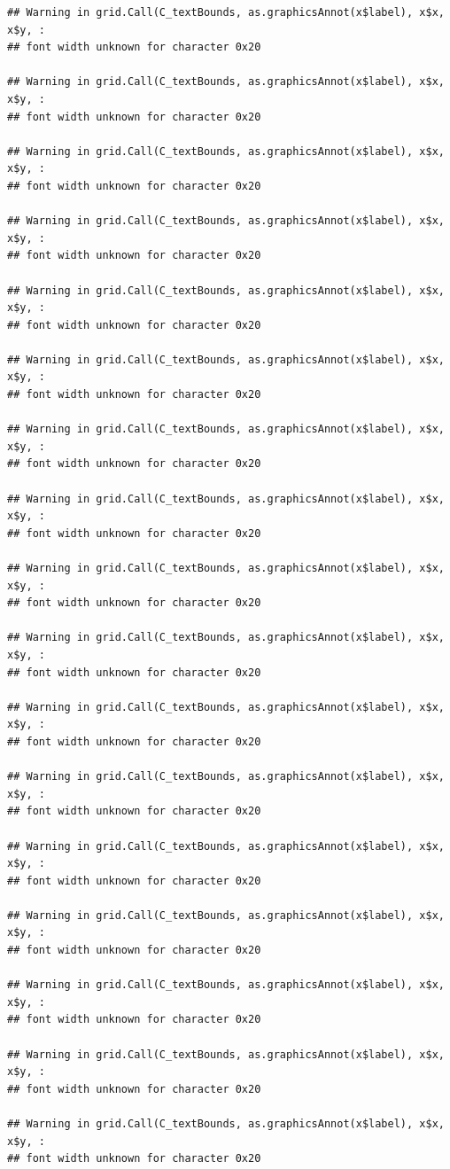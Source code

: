 \documentclass[]{article}
\theoremstyle{definition}
\theoremstyle{definition}
\theoremstyle{definition}
\theoremstyle{remark}
\begin{document}
\begin{verbatim}
## Warning in grid.Call(C_textBounds, as.graphicsAnnot(x$label), x$x, x$y, :
## font width unknown for character 0x20

## Warning in grid.Call(C_textBounds, as.graphicsAnnot(x$label), x$x, x$y, :
## font width unknown for character 0x20

## Warning in grid.Call(C_textBounds, as.graphicsAnnot(x$label), x$x, x$y, :
## font width unknown for character 0x20

## Warning in grid.Call(C_textBounds, as.graphicsAnnot(x$label), x$x, x$y, :
## font width unknown for character 0x20

## Warning in grid.Call(C_textBounds, as.graphicsAnnot(x$label), x$x, x$y, :
## font width unknown for character 0x20

## Warning in grid.Call(C_textBounds, as.graphicsAnnot(x$label), x$x, x$y, :
## font width unknown for character 0x20

## Warning in grid.Call(C_textBounds, as.graphicsAnnot(x$label), x$x, x$y, :
## font width unknown for character 0x20

## Warning in grid.Call(C_textBounds, as.graphicsAnnot(x$label), x$x, x$y, :
## font width unknown for character 0x20

## Warning in grid.Call(C_textBounds, as.graphicsAnnot(x$label), x$x, x$y, :
## font width unknown for character 0x20

## Warning in grid.Call(C_textBounds, as.graphicsAnnot(x$label), x$x, x$y, :
## font width unknown for character 0x20

## Warning in grid.Call(C_textBounds, as.graphicsAnnot(x$label), x$x, x$y, :
## font width unknown for character 0x20

## Warning in grid.Call(C_textBounds, as.graphicsAnnot(x$label), x$x, x$y, :
## font width unknown for character 0x20

## Warning in grid.Call(C_textBounds, as.graphicsAnnot(x$label), x$x, x$y, :
## font width unknown for character 0x20

## Warning in grid.Call(C_textBounds, as.graphicsAnnot(x$label), x$x, x$y, :
## font width unknown for character 0x20

## Warning in grid.Call(C_textBounds, as.graphicsAnnot(x$label), x$x, x$y, :
## font width unknown for character 0x20

## Warning in grid.Call(C_textBounds, as.graphicsAnnot(x$label), x$x, x$y, :
## font width unknown for character 0x20

## Warning in grid.Call(C_textBounds, as.graphicsAnnot(x$label), x$x, x$y, :
## font width unknown for character 0x20


\end{verbatim}
\end{document}
